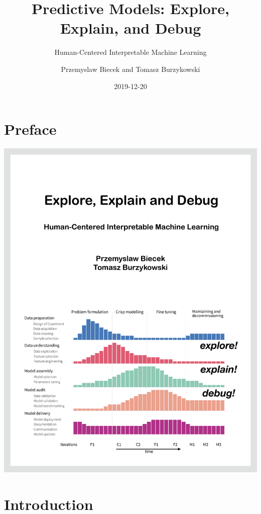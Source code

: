 \documentclass[12pt,]{krantz}
\title{Predictive Models: Explore, Explain, and Debug}
\subtitle{Human-Centered Interpretable Machine Learning}
\author{Przemyslaw Biecek and Tomasz Burzykowski}
\date{2019-12-20}
\begin{document}
\maketitle

{
\hypersetup{linkcolor=black}
\setcounter{tocdepth}{2}
\tableofcontents
}
\listoftables
\listoffigures
\hypertarget{preface}{%
\section*{Preface}\label{preface}}

\begin{center}\includegraphics[width=0.99\linewidth]{figure/front} \end{center}

\hypertarget{introduction}{%
\section{Introduction}\label{introduction}}
\end{document}
